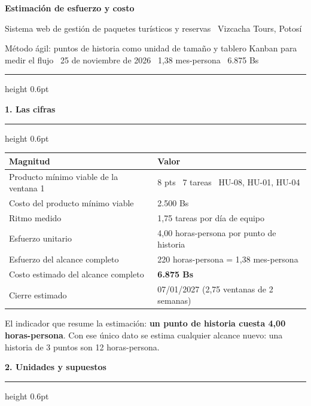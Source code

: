 \documentclass[10pt,letterpaper]{article}
\newcommand{\seccion}[1]{%
  \par\vspace{7pt}%
  {\color{azul}\bfseries\large #1}\par
  \vspace{1pt}%
  {\color{linea}\hrule height 0.6pt}\vspace{4pt}%
}
\begin{document}
{\color{azul}\bfseries\LARGE Estimación de esfuerzo y costo}\par
\vspace{1pt}
{\large Sistema web de gestión de paquetes turísticos y reservas \textperiodcentered\
 Vizcacha Tours, Potosí}\par
\vspace{3pt}
{\small\color{gris} Método ágil: puntos de historia como unidad de tamaño y tablero
Kanban para medir el flujo \textperiodcentered\ 25 de noviembre de 2026 \textperiodcentered\
 1,38 mes-persona \textperiodcentered\ 6.875 Bs}\par
\vspace{3pt}
{\color{linea}\hrule height 0.6pt}\vspace{4pt}

\seccion{1. Las cifras}

{\small
\begin{tabular}{@{}L{0.50\textwidth}R{0.44\textwidth}@{}}
\toprule
\rowcolor{azul!8}
{\color{azul}\bfseries Magnitud} & {\color{azul}\bfseries Valor} \\
\midrule
Producto mínimo viable de la ventana 1 & 8 pts \textperiodcentered\ 7 tareas \textperiodcentered\ HU-08, HU-01, HU-04 \\
Costo del producto mínimo viable & 2.500 Bs \\
Ritmo medido & 1,75 tareas por día de equipo \\
Esfuerzo unitario & 4,00 horas-persona por punto de historia \\
Esfuerzo del alcance completo & 220 horas-persona = 1,38 mes-persona \\
Costo estimado del alcance completo & \textbf{6.875 Bs} \\
Cierre estimado & 07/01/2027 (2,75 ventanas de 2 semanas) \\
\bottomrule
\end{tabular}}

\vspace{3pt}
{\small\color{gris} El indicador que resume la estimación: \textbf{un punto de
historia cuesta 4,00 horas-persona}. Con ese único dato se estima cualquier
alcance nuevo: una historia de 3 puntos son 12 horas-persona.}

\seccion{2. Unidades y supuestos}
\end{document}
